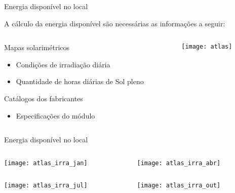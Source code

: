 \begin{frame}{Energia disponível no local}

A cálculo da energia disponível são necessárias as informações a seguir:

\vspace{.5cm}

\begin{columns}[T]
    \begin{column}{0.5\textwidth}
		Mapas solarimétricos
		\begin{itemize}
			\item Condições de irradiação diária
			\item Quantidade de horas diárias de Sol pleno
		\end{itemize}
		\vspace{.5cm}
		Catálogos dos fabricantes
		\begin{itemize}
			\item Especificações do módulo
		\end{itemize}
    \end{column}
    \begin{column}{0.5\textwidth}    
		\centering
      	\texttt{[image: atlas]}
    \end{column}
\end{columns}

\end{frame}

\begin{frame}{Energia disponível no local}

\begin{columns}[T]
    \begin{column}{0.5\textwidth}
    	\centering
      	\texttt{[image: atlas\_irra\_jan]}
    \end{column}
    \begin{column}{0.5\textwidth}
    	\centering
      	\texttt{[image: atlas\_irra\_abr]}
    \end{column}
\end{columns}

\vspace{.25cm}

\begin{columns}[T]
    \begin{column}{0.5\textwidth}
    	\centering
      	\texttt{[image: atlas\_irra\_jul]}
    \end{column}
    \begin{column}{0.5\textwidth}
    	\centering
      	\texttt{[image: atlas\_irra\_out]}
    \end{column}
\end{columns}

\end{frame}

